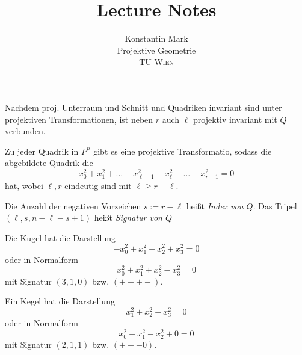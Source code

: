\documentclass[11pt]{article}
\title{Lecture Notes}
\author{Konstantin Mark\\
Projektive Geometrie\\ 
\textsc{TU Wien}
}
\begin{document}
\maketitle
\begin{remark}
Nachdem proj. Unterraum und Schnitt und Quadriken invariant sind unter projektiven Transformationen, ist neben $r$ auch $\ell$ projektiv invariant mit $Q$ verbunden.
\end{remark}

\begin{theorem}
Zu jeder Quadrik in $P^n$ gibt es eine projektive Transformatio, sodass die abgebildete Quadrik die \begin{equation*}
    x_0^2 + x_1^2 + \dots + x_{\ell+1}^2 - x_\ell^2 - \dots - x_{r-1}^2 = 0
\end{equation*}
hat, wobei $\ell , r$ eindeutig sind mit $\ell \geq r-\ell$.
\end{theorem}
\begin{definition}
Die Anzahl der negativen Vorzeichen $s:= r-\ell$ heißt \textit{Index von $Q$}. Das Tripel $(\ell, s, n-\ell-s+1)$ heißt \textit{Signatur von $Q$}
\end{definition}
\begin{example}
Die Kugel hat die Darstellung \begin{equation*}
    -x_0^2 + x_1^2+x_2^2+x_3^2 = 0
\end{equation*}
oder in Normalform
\begin{equation*}
    x_0^2 + x_1^2+x_2^2-x_3^2 = 0
\end{equation*}
mit Signatur $(3,1,0)$ bzw. $(+++-)$.
\end{example}
\begin{example}
Ein Kegel hat die Darstellung\begin{equation*}
    x_1^2+x_2^2-x_3^2 = 0
\end{equation*}
oder in Normalform
\begin{equation*}
    x_0^2 + x_1^2-x_2^2+ 0 = 0
\end{equation*}
mit Signatur $(2,1,1)$ bzw. $(++-0)$.
\end{example}
\end{document}
